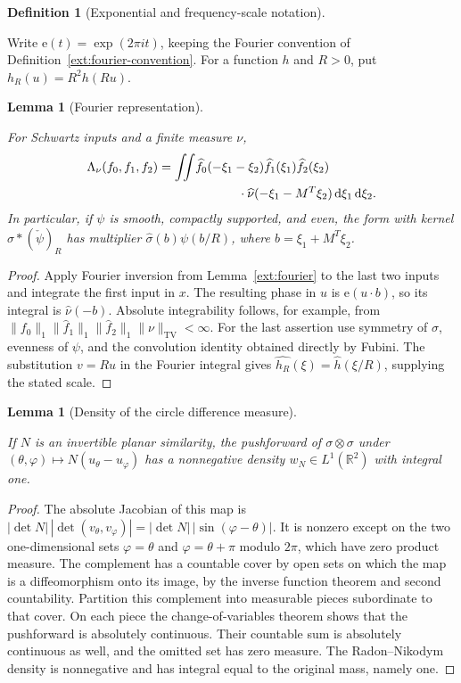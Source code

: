 \documentclass[11pt]{amsart}
\newcommand{\R}{\mathbb R}
\newcommand{\dd}{\,\mathrm d}
\newcommand{\e}{\mathrm e}
\DeclareMathOperator{\TV}{TV}
\newtheorem{lemma}[theorem]{Lemma}
\theoremstyle{definition}
\newtheorem{definition}[theorem]{Definition}
\theoremstyle{remark}
\numberwithin{equation}{section}
\providecommand{\lean}[1]{}
\providecommand{\leanok}{}
\begin{document}
\begin{definition}[Exponential and frequency-scale notation]\label{def:fourier}
\lean{Auto.e,Auto.scaleR}
Write $\e(t)=\exp(2\pi it)$, keeping the Fourier convention of
Definition~\ref{ext:fourier-convention}.  For a function $h$ and
$R>0$, put $h_R(u)=R^2h(Ru)$.
\end{definition}

\begin{lemma}[Fourier representation]\label{lem:fourier-form}
\lean{Auto.lem_fourier_form,Auto.lem_fourier_form_multiplier}
\leanok
For Schwartz inputs and a finite measure $\nu$,
\begin{align*}
 \Lambda_\nu(f_0,f_1,f_2)
  =\iint &\widehat f_0(-\xi_1-\xi_2)
        \widehat f_1(\xi_1)\widehat f_2(\xi_2)\\
   &\hspace{12mm}\cdot\widehat\nu(-\xi_1-M^T\xi_2)
             \dd\xi_1\dd\xi_2.
\end{align*}
In particular, if $\psi$ is smooth, compactly supported, and even,
the form with kernel $\sigma*(\check\psi)_R$ has multiplier
$\widehat\sigma(b)\psi(b/R)$, where $b=\xi_1+M^T\xi_2$.
\end{lemma}
\begin{proof}
Apply Fourier inversion from Lemma~\ref{ext:fourier} to the last two inputs and integrate the
first input in $x$.  The resulting phase in $u$ is $\e(u\cdot b)$,
so its integral is $\widehat\nu(-b)$.  Absolute integrability
follows, for example, from
$\|f_0\|_1
  \|\widehat f_1\|_1\|\widehat f_2\|_1\|\nu\|_{\TV}<\infty$.
For the last assertion use symmetry of $\sigma$, evenness of
$\psi$, and the convolution identity obtained directly by Fubini.
The substitution $v=Ru$ in the Fourier integral gives
$\widehat{h_R}(\xi)=\widehat h(\xi/R)$, supplying the stated scale.
\end{proof}

\begin{lemma}[Density of the circle difference measure]\label{lem:circle-difference}
\lean{Auto.lem_circle_difference}
\leanok
If $N$ is an invertible planar similarity, the pushforward of
$\sigma\otimes\sigma$ under
$(\theta,\varphi)\mapsto N(u_\theta-u_\varphi)$ has a
nonnegative density $w_N\in L^1(\R^2)$ with integral one.
\end{lemma}
\begin{proof}
The absolute Jacobian of this map is
$|\det N|\,|\det(v_\theta,v_\varphi)|
 =|\det N|\,|\sin(\varphi-\theta)|$.
It is nonzero except on the two one-dimensional sets
$\varphi=\theta$ and $\varphi=\theta+\pi$ modulo $2\pi$,
which have zero product measure.  The complement has a countable
cover by open sets on which the map is a diffeomorphism onto its
image, by the inverse function theorem and second countability.
Partition this complement into measurable pieces subordinate to
that cover.  On each piece the change-of-variables theorem shows
that the pushforward is absolutely continuous.  Their countable
sum is absolutely continuous as well, and the omitted set has
zero measure.  The Radon--Nikodym density is nonnegative and
has integral equal to the original mass, namely one.
\end{proof}
\end{document}
